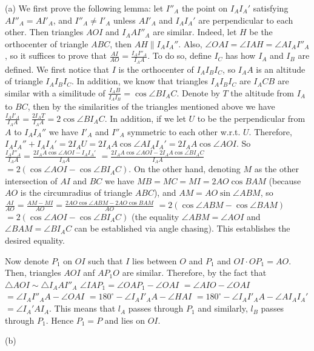 \documentclass[11pt,a4paper]{article}
\begin{document}
\begin{itemize}
(a) We first prove the following lemma: let $I''_A$ the point on $I_AI_A'$ satisfying $AI''_A=AI'_A$, and $I''_A\neq I'_A$ unless $AI'_A$ and $I_AI_A'$ are perpendicular to each other. Then triangles $AOI$ and $I_AAI''_A$ are similar. 
Indeed, let $H$ be the orthocenter of triangle $ABC$, then $AH\parallel I_AI_A''$. 
Also, $\angle OAI=\angle IAH=\angle AI_AI''_A$, so it suffices to prove that $\frac{AI}{AO}=\frac{I_AI''_A}{I_AA}$. 
To do so, define $I_C$ has how $I_A$ and $I_B$ are defined. 
We first notice that $I$ is the orthocenter of $I_AI_BI_C$, so $I_AA$ is an altitude of triangle $I_AI_BI_C$. 
In addition, we know that triangles $I_AI_BI_C$ are $I_ACB$ are similar with a similitude of $\frac {I_AB}{I_AI_B}=\cos\angle BI_AC$.
Denote by $T$ the altitude from $I_A$ to $BC$, then by the similarities of the triangles mentioned above we have 
$\frac {I_AI'_A}{I_AA}=\frac{2I_AT}{I_AA}=2\cos\angle BI_AC$. 
In addition, if we let $U$ to be the perpendicular from $A$ to $I_AI_A''$ we have $I'_A$ and $I''_A$ symmetric to each other w.r.t. $U$. 
Therefore, $I_AI_A''+I_AI_A'=2I_AU=2I_AA\cos\angle AI_AI_A'=2I_AA\cos\angle AOI$. 
So $\frac{I_AI''_A}{I_AA}=\frac{2I_AA\cos\angle AOI-I_AI_A'}{I_AA}$
$=\frac{2I_AA\cos\angle AOI-2I_AA\cos\angle BI_AC}{I_AA}$
$=2(\cos\angle AOI-\cos\angle BI_AC)$. 
On the other hand, denoting $M$ as the other intersection of $AI$ and $BC$ we have 
$MB=MC=MI=2AO\cos BAM$ (because $AO$ is the circumradius of triangle $ABC$), 
and $AM=AO\sin\angle ABM$, 
so $\frac{AI}{AO}=\frac{AM-MI}{AO}=\frac{2AO\cos\angle ABM-2AO\cos BAM}{AO}$
$=2(\cos\angle ABM-\cos\angle BAM)$
$=2(\cos\angle AOI-\cos\angle BI_AC)$
(the equality $\angle ABM=\angle AOI$ and $\angle BAM=\angle BI_AC$ can be established via angle chasing). 
This establishes the desired equality. 

Now denote $P_1$ on $OI$ such that $I$ lies between $O$ and $P_1$ and $OI\cdot OP_1=AO$. 
Then, triangles $AOI$ anf $AP_1O$ are similar. 
Therefore, by the fact that $\triangle AOI\sim \triangle I_AAI''_A$ $\angle IAP_1=\angle OAP_1-\angle OAI$
$=\angle AIO-\angle OAI$
$=\angle I_AI''_AA-\angle OAI$
$=180^{\circ}-\angle I_AI'_AA-\angle HAI$
$=180^{\circ}-\angle I_AI'_AA-\angle AI_AI_A'$
$=\angle I_A'AI_A$. 
This means that $l_A$ passes through $P_1$ and similarly, $l_B$ passes through $P_1$. Hence $P_1=P$ and lies on $OI$. 

(b) 


\end{itemize}
\end{document}
